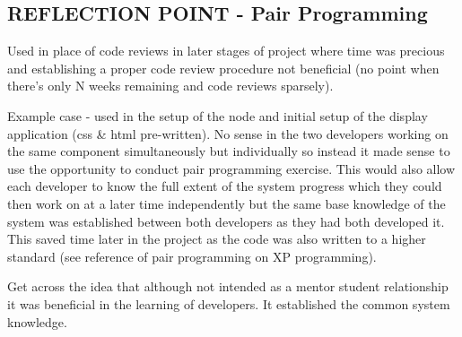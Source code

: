 \documentclass{l3proj}
\begin{document}
\subsection{REFLECTION POINT - Pair Programming}
\label{sec:pairprogramming}




Used in place of code reviews in later stages of project where time was precious and establishing a proper code review procedure not beneficial (no point when there's only N weeks remaining and code reviews sparsely). 

Example case - used in the setup of the node and initial setup of the display application (css \& html pre-written). No sense in the two developers working on the same component simultaneously but individually so instead it made sense to use the opportunity to conduct pair programming exercise. This would also allow each developer to know the full extent of the system progress which they could then work on at a later time independently but the same base knowledge of the system was established between both developers as they had both developed it. This saved time later in the project as the code was also written to a higher standard (see reference of pair programming on XP programming). 

Get across the idea that although not intended as a mentor student relationship it was beneficial in the learning of developers. It established the common system knowledge.
\end{document}
